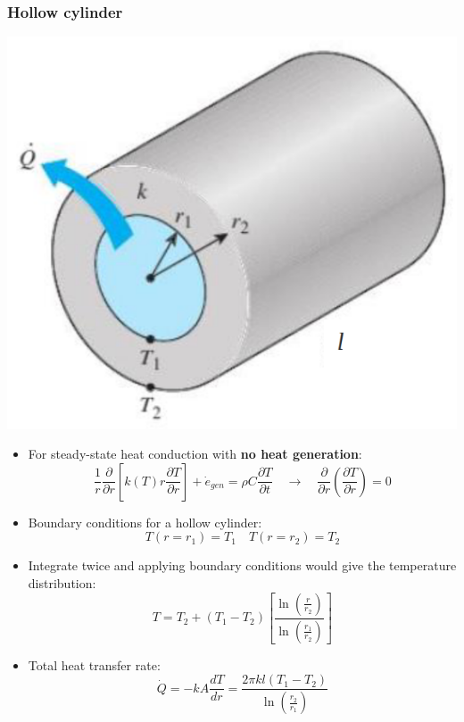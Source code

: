 \documentclass[11pt]{article}
\begin{document}
\subsubsection{Hollow cylinder}
\label{sec:orga148863}
\begin{center}
\includegraphics[width=.9\linewidth]{./images/steady-state-heat-conduction-hollow-cylinder.png}
\end{center}
\begin{itemize}
\item For steady-state heat conduction with \textbf{no heat generation}:
\[\frac{1}{r} \frac{\partial}{\partial r} \left[k(T) r \frac{\partial T}{\partial r} \right] + \dot{e}_{gen} = \rho C \frac{\partial T}{\partial t} \quad \rightarrow \quad \frac{\partial}{\partial r} \left(\frac{\partial T}{\partial r} \right) = 0\]
\item Boundary conditions for a hollow cylinder:
\[T(r = r_1) = T_1 \quad T(r = r_2) = T_2\]
\item Integrate twice and applying boundary conditions would give the temperature distribution:
\[T = T_2 + (T_1 - T_2) \left[\frac{\ln \left( \frac{r}{r_2} \right)}{\ln \left( \frac{r_1}{r_2} \right)} \right]\]
\item Total heat transfer rate:
\[\dot{Q} = -kA \frac{dT}{dr} = \frac{2 \pi kl (T_1 - T_2)}{\ln \left(\frac{r_2}{r_1} \right)}\]
\end{itemize}
\end{document}
